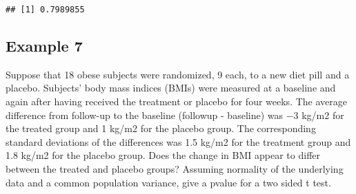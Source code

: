 \documentclass[
]{article}
\newenvironment{Shaded}{\begin{snugshade}}{\end{snugshade}}
\newcommand{\DataTypeTok}[1]{\textcolor[rgb]{0.13,0.29,0.53}{#1}}
\newcommand{\DecValTok}[1]{\textcolor[rgb]{0.00,0.00,0.81}{#1}}
\newcommand{\FloatTok}[1]{\textcolor[rgb]{0.00,0.00,0.81}{#1}}
\newcommand{\KeywordTok}[1]{\textcolor[rgb]{0.13,0.29,0.53}{\textbf{#1}}}
\newcommand{\NormalTok}[1]{#1}
\newcommand{\OperatorTok}[1]{\textcolor[rgb]{0.81,0.36,0.00}{\textbf{#1}}}
\newcommand{\StringTok}[1]{\textcolor[rgb]{0.31,0.60,0.02}{#1}}
\begin{document}
\begin{Shaded}
\end{Shaded}

\begin{verbatim}
## [1] 0.7989855
\end{verbatim}

\hypertarget{example-7}{%
\subsection{Example 7}\label{example-7}}

Suppose that 18 obese subjects were randomized, 9 each, to a new diet
pill and a placebo. Subjects' body mass indices (BMIs) were measured at
a baseline and again after having received the treatment or placebo for
four weeks. The average difference from follow-up to the baseline
(followup - baseline) was −3 kg/m2 for the treated group and 1 kg/m2 for
the placebo group. The corresponding standard deviations of the
differences was 1.5 kg/m2 for the treatment group and 1.8 kg/m2 for the
placebo group. Does the change in BMI appear to differ between the
treated and placebo groups? Assuming normality of the underlying data
and a common population variance, give a pvalue for a two sided t test.
\end{document}
